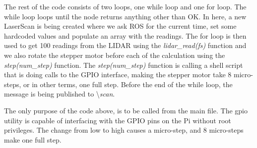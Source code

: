 The rest of the code consists of two loops, one while loop and one for loop. The while loop loops until the node returns anything other than OK. In here, a new LaserScan is being created where we ask ROS for the current time, set some hardcoded values and populate an array with the readings. The for loop is then used to get 100 readings from the LIDAR using the \textit{lidar\_read(fs)} function and we also rotate the stepper motor before each of the calculation using the \textit{step(num\_step)} function. The \textit{step(num\_step)} function is calling a shell script that is doing calls to the GPIO interface, making the stepper motor take 8 micro-steps, or in other terms, one full step. Before the end of the while loop, the message is being published to \textbackslash\textit{scan}.



The only purpose of the code above, is to be called from the main file. The gpio utility is capable of interfacing with the GPIO pins on the Pi without root privileges. The change from low to high causes a micro-step, and 8 micro-steps make one full step.
